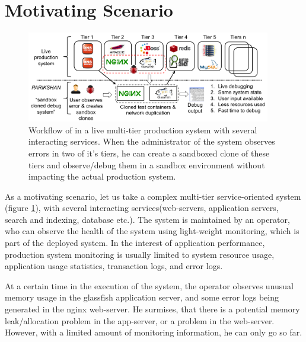 \section{Motivating Scenario}
\label{sec:motivation}

\begin{figure}[ht!]
  \begin{center}
    \includegraphics[width=0.95\textwidth]{figs/workflow3.png}
    \caption{Workflow of \parikshan in a live multi-tier production system with several interacting services. When the administrator of the system observes errors in two of it's tiers, he can create a sandboxed clone of these tiers and observe/debug them in a sandbox environment without impacting the actual production system.}
    \label{fig:motivation}
  \end{center}
\end{figure}

\noindent
As a motivating scenario, let us take a complex multi-tier service-oriented system (figure \ref{fig:motivation}), with several interacting services(web-servers, application servers, search and indexing, database etc.). 
The system is maintained by an operator, who can observe the health of the system using light-weight monitoring, which is part of the deployed system.
In the interest of application performance, production system monitoring is usually limited to system resource usage, application usage statistics, transaction logs, and error logs.

At a certain time in the execution of the system, the operator observes unusual memory usage in the glassfish application server, and some error logs being generated in the nginx web-server. 
He surmises, that there is a potential memory leak/allocation problem in the app-server, or a problem in the web-server.
However, with a limited amount of monitoring information, he can only go so far.

